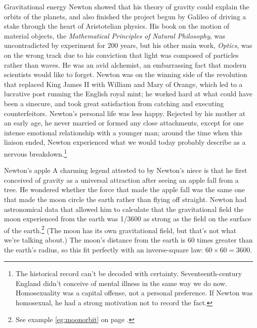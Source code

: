 \begin{envsubsection}{Gravitational energy}
Newton showed that his theory of gravity could explain the orbits of the planets, and
also finished the project begun by Galileo of driving a stake through the heart of
Aristotelian physics. His book on the motion of material objects, the \emph{Mathematical
Principles of Natural Philosophy},
was uncontradicted by experiment for 200 years,
but his other main work, \emph{Optics},
 was on the wrong track due to his conviction
that light was composed of particles rather than waves. He was an avid alchemist,
an embarrassing fact that modern scientists would like to forget. Newton was
on the winning side of the revolution that replaced King James II with William and Mary
of Orange, which led to a lucrative post running the English royal mint; he worked hard at
what could have been a sinecure, and took great
satisfaction from catching and executing counterfeitors. Newton's personal life was less
happy. Rejected by his mother at an early age, he never married or formed any close
attachments, except for one intense emotional relationship with a younger man; around the time when this
liaison ended, Newton experienced what we would today probably describe as a nervous breakdown.\footnote{The historical
record can't be decoded with certainty. Seventeenth-century England didn't conceive of mental illness in the same way we
do now. Homosexuality was a capital offense, not a personal preference. If Newton was homosexual, he had a
strong motivation not to record the fact.}


\begin{eg}{Newton's apple}\label{eg:newtonsapple}
A charming legend attested to by Newton's niece is that he first conceived of
gravity as a universal attraction after seeing an apple fall from a tree. He
wondered whether the force that made the apple fall was the same one that made the
moon circle the earth rather than flying off straight. Newton had astronomical data
that allowed him to calculate
that the gravitational field the moon experienced
from the earth was 1/3600 as strong as the field on the surface of the earth.\footnote{See example
\ref{eg:moonorbit} on page \pageref{eg:moonorbit}.}
(The moon has its own gravitational field, but that's not what we're talking about.)
The moon's distance from the earth is 60 times greater than the earth's radius,
so this fit perfectly with an inverse-square law: $60\times60=3600$.
\end{eg}
\end{envsubsection}
